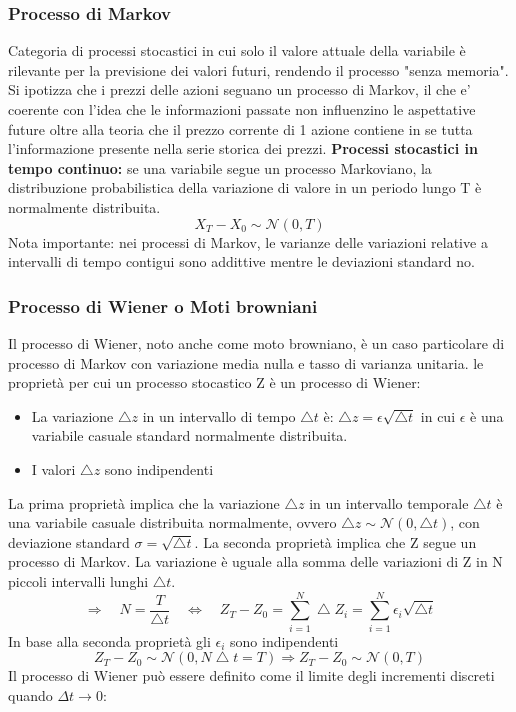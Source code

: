 \documentclass[12pt,a4paper]{report}
\begin{document}
\subsubsection{Processo di Markov}
Categoria di processi stocastici in cui solo il valore attuale della variabile è rilevante per la previsione dei valori futuri, rendendo il processo "senza memoria".
Si ipotizza che i prezzi delle azioni seguano un processo di Markov, il che e' coerente con l'idea che le informazioni passate non influenzino le aspettative future oltre alla teoria che il prezzo corrente di 1 azione contiene in se tutta l'informazione presente nella serie storica dei prezzi.
\newline
\textbf{Processi stocastici in tempo continuo:} se una variabile segue un processo Markoviano, la distribuzione probabilistica della variazione di valore in un periodo lungo T è normalmente distribuita.
\[
X_T - X_0 \sim \mathcal{N} (0, T)
\]
Nota importante: nei processi di Markov, le varianze delle variazioni relative a intervalli di tempo contigui sono addittive mentre le deviazioni standard no.
\subsubsection{Processo di Wiener o Moti browniani}
Il processo di Wiener, noto anche come moto browniano, è un caso particolare di processo di Markov con variazione media nulla e tasso di varianza unitaria.
 le proprietà per cui un processo stocastico Z è un processo di Wiener:
\begin{itemize}
    \item La variazione \(\bigtriangleup z\) in un intervallo di tempo \(\bigtriangleup t\) è: \(\bigtriangleup z = \epsilon \sqrt{\bigtriangleup t}\)
    in cui \(\epsilon\) è una variabile casuale standard normalmente distribuita.
    \item I valori \(\bigtriangleup z\) sono indipendenti
\end{itemize}
La prima proprietà implica che la variazione \(\bigtriangleup z\) in un intervallo temporale \(\bigtriangleup t\) è una variabile casuale distribuita normalmente, ovvero \(\bigtriangleup z \sim \mathcal{N}(0, \bigtriangleup t)\), con deviazione standard \(\sigma = \sqrt{\bigtriangleup t}\).
\newline
La seconda proprietà implica che Z segue un processo di Markov.
La variazione è uguale alla somma delle variazioni di Z in N piccoli intervalli lunghi \(\bigtriangleup t\).
\[
\Longrightarrow \quad N = \frac{T}{\bigtriangleup t} \quad \Longleftrightarrow \quad Z_T - Z_0 = \sum_{i=1}^{N} \bigtriangleup Z_i = \sum_{i=1}^{N} \epsilon_i \sqrt{\bigtriangleup t}
\]
In base alla seconda proprietà gli \(\epsilon_i\) sono indipendenti
\[
Z_T - Z_0 \sim \mathcal{N}(0, N \bigtriangleup t = T) \Longrightarrow Z_T - Z_0 \sim \mathcal{N}(0, T)
\]
Il processo di Wiener può essere definito come il limite degli incrementi discreti quando \(\Delta t \to 0\):
\end{document}
